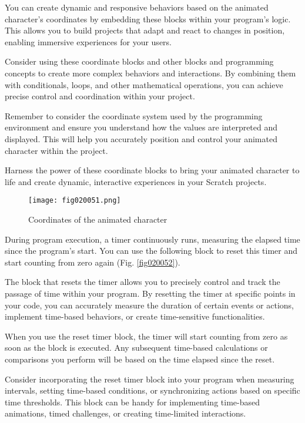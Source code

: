 You can create dynamic and responsive behaviors based on the animated character's coordinates by embedding these blocks within your program's logic. This allows you to build projects that adapt and react to changes in position, enabling immersive experiences for your users.

Consider using these coordinate blocks and other blocks and programming concepts to create more complex behaviors and interactions. By combining them with conditionals, loops, and other mathematical operations, you can achieve precise control and coordination within your project.

Remember to consider the coordinate system used by the programming environment and ensure you understand how the values are interpreted and displayed. This will help you accurately position and control your animated character within the project.

Harness the power of these coordinate blocks to bring your animated character to life and create dynamic, interactive experiences in your Scratch projects.

\begin{figure}[H]
   \centering
   \texttt{[image: fig020051.png]}
   \caption{Coordinates of the animated character}
\label{fig020051}
\end{figure}

During program execution, a timer continuously runs, measuring the elapsed time since the program's start. You can use the following block to reset this timer and start counting from zero again (Fig. \ref{fig020052}).

The block that resets the timer allows you to precisely control and track the passage of time within your program. By resetting the timer at specific points in your code, you can accurately measure the duration of certain events or actions, implement time-based behaviors, or create time-sensitive functionalities.

When you use the reset timer block, the timer will start counting from zero as soon as the block is executed. Any subsequent time-based calculations or comparisons you perform will be based on the time elapsed since the reset.

Consider incorporating the reset timer block into your program when measuring intervals, setting time-based conditions, or synchronizing actions based on specific time thresholds. This block can be handy for implementing time-based animations, timed challenges, or creating time-limited interactions.

